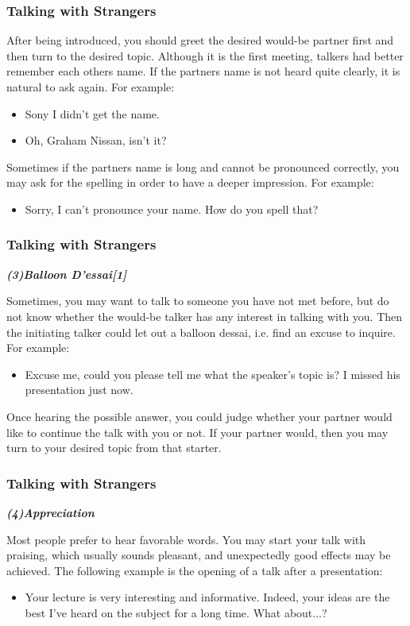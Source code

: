 \documentclass[aspectratio=169,UTF8,c]{beamer}%
\begin{document}
\begin{frame}
	\frametitle{Talking with Strangers}
	After being introduced, you should greet the desired would-be partner first and then turn to the desired topic. Although it is the first meeting, talkers had better remember each others name. If the partners name is not heard quite clearly, it is natural to ask again. For example:
	\begin{itemize}
		\item Sony I didn't get the name.
		\item Oh, Graham Nissan, isn't it?
	\end{itemize}
	
	Sometimes if the partners name is long and cannot be pronounced correctly, you may ask for the spelling in order to have a deeper impression. For example:
	\begin{itemize}
		\item Sorry, I can't pronounce your name. How do you spell that?
	\end{itemize}
\end{frame}
\begin{frame}
	\frametitle{Talking with Strangers}
	\emph{\textbf{(3)Balloon D'essai[1]}}
	
	Sometimes, you may want to talk to someone you have not met before, but do not know whether the would-be talker has any interest in talking with you. Then the initiating talker could let out a balloon dessai, i.e. find an excuse to inquire. For example:
	\begin{itemize}
		\item Excuse me, could you please tell me what the speaker's topic is? I missed his presentation just now.
	\end{itemize}
	
	Once hearing the possible answer, you could judge whether your partner would like to continue the talk with you or not. If your partner would, then you may turn to your desired topic from that starter.
\end{frame}
\begin{frame}
	\frametitle{Talking with Strangers}
	\emph{\textbf{(4)Appreciation}}
	
	Most people prefer to hear favorable words. You may start your talk with praising, which usually sounds pleasant, and unexpectedly good effects may be achieved. The following example is the opening of a talk after a presentation:
	\begin{itemize}
		\item Your lecture is very interesting and informative. Indeed, your ideas are the best I've heard on the subject for a long time. What about...?
	\end{itemize}
\end{frame}
\end{document}
